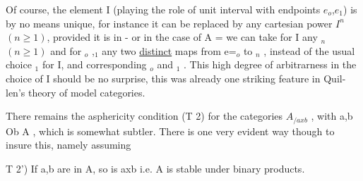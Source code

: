 
Of course,  the element I  (playing the role of unit interval with
endpoints $e_o$,$e_1$) is by no means unique,  for instance it can be replaced
by any cartesian power $I^n$ $(n\geqslant 1)$,  provided it is in   -  or in the case
of A = \hand{$\Delta$}  we can take for I any \hand{$\Delta$}$_n$ $(n\geqslant 1)$ and for \hand{$\delta$}$_o$ ,\hand{$\delta$}$_1$ any two \uline{distinct}
maps from e=\hand{$\Delta$}$_o$ to \hand{$\Delta$}$_n$ , instead of the usual choice  \hand{$\Delta$}$_1$ for I, and
corresponding \hand{$\delta$}$_o$ and \hand{$\delta$}$_1$ .  This high degree of arbitrarness in the choice
of I should be no surprise,  this was already one striking feature in Quil-%
len's theory of model categories.

There remains the asphericity condition (T 2)  for the categories
$A_{/axb}$ ,  with  a,b \hand{$\in$} Ob A ,  which is somewhat subtler.  There is one very
evident way though to insure this, namely assuming

T 2')  If a,b are in A,  so is axb  i.e. A is stable under binary products.

